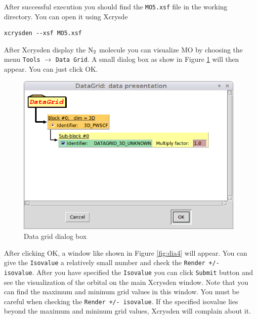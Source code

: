 \documentclass[12pt,english]{paper}
\begin{document}
After successful execution you should find the \texttt{MO5.xsf} file
in the working directory. You can open it using Xcrysde

\begin{lstlisting}
xcrysden --xsf MO5.xsf
\end{lstlisting}


After Xcrysden display the $\ce{N2}$ molecule you can visualize MO
by choosing the menu \texttt{Tools} $\rightarrow$ \texttt{Data Grid}.
A small dialog box as show in Figure \ref{fig:dia3} will then appear.
You can just click OK.

\begin{figure}[H]
\noindent \begin{centering}
\includegraphics[scale=0.3]{images/DatagridWindow}
\par\end{centering}

\caption{Data grid dialog box \label{fig:dia3}}
\end{figure}


After clicking OK, a window like shown in Figure \ref{fig:dia4} will
appear. You can give the \texttt{Isovalue} a relatively small number
and check the \texttt{Render +/- isovalue}. After you have specified
the \texttt{Isovalue} you can click \texttt{Submit} button and see
the visualization of the orbital on the main Xcrysden window. Note
that you can find the maximum and mininum grid values in this window.
You must be careful when checking the \texttt{Render +/- isovalue}.
If the specified isovalue lies beyond the maximum and mininum grid
values, Xcrysden will complain about it.
\end{document}
